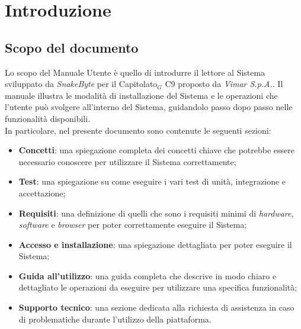 \documentclass[10pt, letterpaper]{article}
\begin{document}
\makeTitlePage

\newpage 
{}
\makeChangelog

\newpage

\tableofcontents

\newpage

\listoffigures

\newpage



\section{Introduzione}

\subsection{Scopo del documento}
Lo scopo del Manuale Utente è quello di introdurre il lettore al Sistema sviluppato da \textit{SnakeByte} per il Capitolato${_G}$ C9 proposto da \textit{Vimar S.p.A.}.
Il manuale illustra le modalità di installazione del Sistema e le operazioni che l'utente può svolgere all'interno del Sistema, guidandolo passo dopo passo nelle funzionalità disponibili.
\\In particolare, nel presente documento sono contenute le seguenti sezioni:
\begin{itemize}
    \item \textbf{Concetti}: una spiegazione completa dei concetti chiave che potrebbe essere necessario conoscere per utilizzare il Sistema correttamente;
    \item \textbf{Test}: una spiegazione su come eseguire i vari test di unità, integrazione e accettazione;
    \item \textbf{Requisiti}: una definizione di quelli che sono i requisiti minimi di \textit{hardware}, \textit{software} e \textit{browser} per poter correttamente eseguire il Sistema;
    \item \textbf{Accesso e installazione}: una spiegazione dettagliata per poter eseguire il Sistema;
    \item \textbf{Guida all'utilizzo}: una guida completa che descrive in modo chiaro e dettagliato le operazioni da eseguire per utilizzare una specifica funzionalità;
    \item \textbf{Supporto tecnico}: una sezione dedicata alla richiesta di assistenza in caso di problematiche durante l'utilizzo della piattaforma.
\end{itemize}
\end{document}
